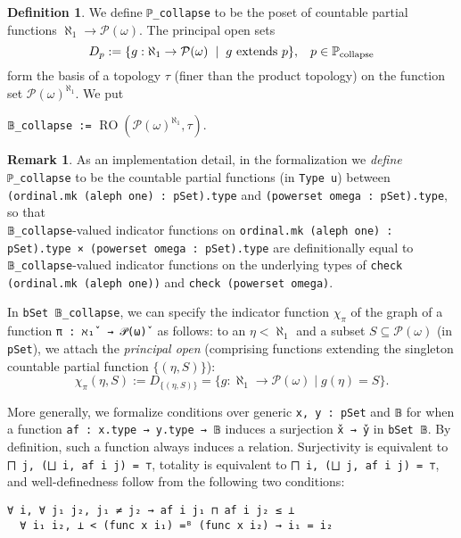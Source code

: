 \documentclass[sigplan,10pt,review, anonymous]{acmart}
\newcommand{\lil}{\lstinline}
\theoremstyle{definition}
\newtheorem{defn}{Definition}[section]
\newtheorem{remark}{Remark}[section]
\begin{document}
\begin{defn}\label{def-collapse-poset}
  We define \lstinline{ℙ_collapse} to be the poset of countable partial functions \(\aleph_1 \to \mathcal{P}(\omega)\). The principal open sets \[D_p := \{g : \aleph_1 \to \mathcal{P}(\omega) \hspace{2mm} | \hspace{2mm} g \text{ extends } p\} , \hspace{3mm} p \in \mathbb{P}_{\text{collapse}}\] form the basis of a topology \(\tau\) (finer than the product topology) on the function set \(\mathcal{P}(\omega)^{\aleph_1}\). We put
  \begin{center}
  \lstinline{𝔹_collapse :=} \(\operatorname{RO}\left(\mathcal{P}(\omega)^{\aleph_1}, \tau\right)\).
  \end{center}
\end{defn}

\begin{remark}
  As an implementation detail, in the formalization we \emph{define} \lil{ℙ_collapse} to be the countable partial functions (in \lil{Type u}) between \lil{(ordinal.mk (aleph one) : pSet).type} and \lil{(powerset omega : pSet).type}, so that \\\lil{𝔹_collapse}-valued indicator functions on \lil{ordinal.mk (aleph one) : pSet).type × (powerset omega : pSet).type} are definitionally equal to \lil{𝔹_collapse}-valued indicator functions on the underlying types of \lil{check (ordinal.mk (aleph one))} and \lil{check (powerset omega)}.
\end{remark}

In \lil{bSet 𝔹_collapse}, we can specify the indicator function \(\chi_{\pi}\) of the graph of a function \lil{π : ℵ₁̌  → 𝒫(ω)̌ } as follows: to an \(\eta < \aleph_1\) and a subset \(S \subseteq \mathcal{P}(\omega)\) (in \lil{pSet}), we attach the \emph{principal open} (comprising functions extending the singleton countable partial function \(\{(\eta, S)\}\)):
\[
  \chi_\pi (\eta, S) := D_{\{(\eta, S)\}} = \{g : \aleph_1 \to \mathcal{P}(\omega) \operatorname{|} g (\eta) = S\}.
\]

More generally, we formalize conditions over generic \lil{x, y : pSet} and \lil{𝔹} for when a function \lil{af : x.type → y.type → 𝔹} induces a surjection \lil{x̌ → y̌} in \lil{bSet 𝔹}. By definition, such a function always induces a relation. Surjectivity is equivalent to \lil{⨅ j, (⨆ i, af i j) = ⊤}, totality is equivalent to \lil{⨅ i, (⨆ j, af i j) = ⊤}, and well-definedness follow from the following two conditions:
\begin{lstlisting}
∀ i, ∀ j₁ j₂, j₁ ≠ j₂ → af i j₁ ⊓ af i j₂ ≤ ⊥
  ∀ i₁ i₂, ⊥ < (func x i₁) =ᴮ (func x i₂) → i₁ = i₂
\end{lstlisting}
\end{document}
